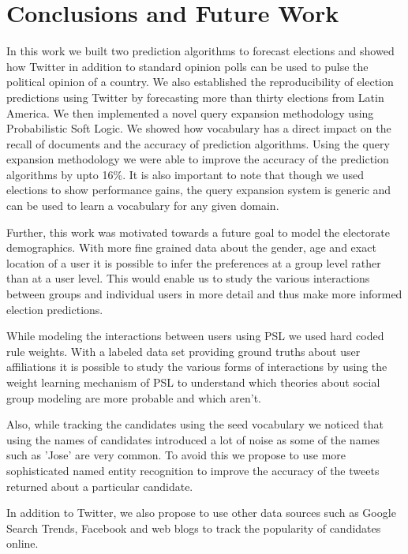 \chapter{Conclusions and Future Work}
In this work we built two prediction algorithms to forecast elections and showed how Twitter in addition to standard opinion polls can be used to pulse the political opinion of a country.
We also established the reproducibility of election predictions using Twitter by forecasting more than thirty elections from Latin America.
We then implemented a novel query expansion methodology using Probabilistic Soft Logic.
We showed how vocabulary has a direct impact on the recall of documents and the accuracy of prediction algorithms.
Using the query expansion methodology we were able to improve the accuracy of the prediction algorithms by upto 16\%.  
It is also important to note that though we used elections to show performance gains, the query expansion system is generic and can be used to learn a vocabulary for any given domain.

Further, this work was motivated towards a future goal to model the electorate demographics.
With more fine grained data about the gender, age and exact location of a user it is possible to infer the preferences at a group level rather than at a user level.
This would enable us to study the various interactions between groups and individual users in more detail and thus make more informed election predictions.

While modeling the interactions between users using PSL we used hard coded rule weights. 
With a labeled data set providing ground truths about user affiliations it is possible to study the various forms of interactions by using the weight learning mechanism of PSL to understand which theories about social group modeling are more probable and which aren't.

Also, while tracking the candidates using the seed vocabulary we noticed that using the names of candidates introduced a lot of noise as some of the names such as 'Jose' are very common. 
To avoid this we propose to use more sophisticated named entity recognition to improve the accuracy of the tweets returned about a particular candidate. 

In addition to Twitter, we also propose to use other data sources such as Google Search Trends, Facebook and web blogs to track the popularity of candidates online.